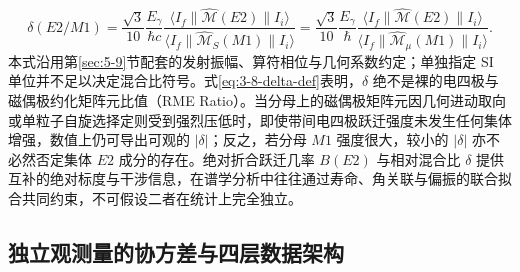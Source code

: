 \begin{itemize}
\begin{equation}
\delta(E2/M1) = \frac{\sqrt{3}}{10} \frac{E_\gamma}{\hbar c} \frac{\langle I_f \| \hat{\mathcal{M}}(E2) \| I_i \rangle}{\langle I_f \| \hat{\mathcal{M}}_S(M1) \| I_i \rangle} = \frac{\sqrt{3}}{10} \frac{E_\gamma}{\hbar} \frac{\langle I_f \| \hat{\mathcal{M}}(E2) \| I_i \rangle}{\langle I_f \| \hat{\mathcal{M}}_\mu(M1) \| I_i \rangle} .
\end{equation}
本式沿用第\ref{sec:5-9}节配套的发射振幅、算符相位与几何系数约定；单独指定 SI 单位并不足以决定混合比符号。式\eqref{eq:3-8-delta-def}表明，$\delta$ 绝不是裸的电四极与磁偶极约化矩阵元比值（RME Ratio）。当分母上的磁偶极矩阵元因几何进动取向或单粒子自旋选择定则受到强烈压低时，即使带间电四极跃迁强度未发生任何集体增强，数值上仍可导出可观的 $|\delta|$；反之，若分母 $M1$ 强度很大，较小的 $|\delta|$ 亦不必然否定集体 $E2$ 成分的存在。绝对折合跃迁几率 $B(E2)$ 与相对混合比 $\delta$ 提供互补的绝对标度与干涉信息，在谱学分析中往往通过寿命、角关联与偏振的联合拟合共同约束，不可假设二者在统计上完全独立。
\end{itemize}

\subsection{独立观测量的协方差与四层数据架构}\label{sec:3-8-3}

